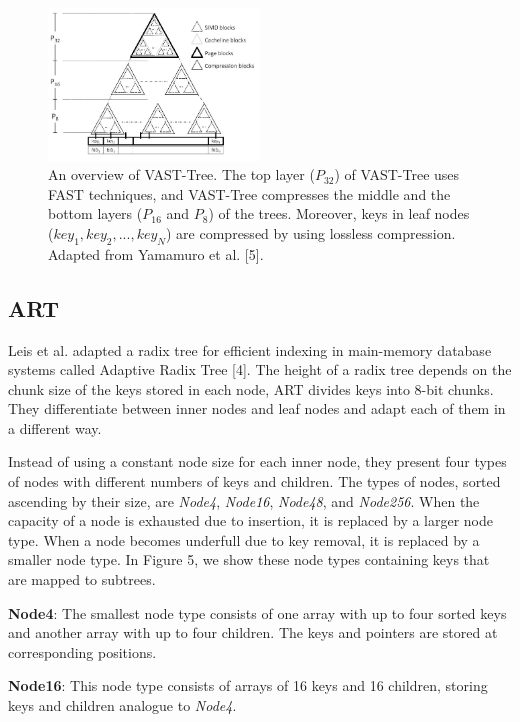 \documentclass[conference]{IEEEtran}
\begin{document}
\begin{figure}
	\includegraphics[width=0.5\textwidth]{figure_5.png}
	\caption{An overview of VAST-Tree. The top layer ($P_{32}$) of VAST-Tree uses FAST techniques, and VAST-Tree compresses the middle and the bottom layers ($P_{16}$ and $P_8$) of the trees. Moreover, keys in leaf nodes ($key_1, key_2, ...,	key_N$) are compressed by using lossless compression. Adapted from Yamamuro et al. [5].}
	\label{fig}
\end{figure}


\subsection{ART}\label{SCM}
Leis et al. adapted a radix tree for efficient indexing in main-memory database systems called Adaptive Radix Tree [4]. The height of a radix tree depends on the chunk size of the keys stored in each node, ART divides keys into 8-bit chunks. They differentiate between inner nodes and leaf nodes and adapt each of them in a different way.

Instead of using a constant node size for each inner node, they present four types of nodes with different numbers of keys and children. The types of nodes, sorted ascending by their size, are \emph{Node4}, \emph{Node16}, \emph{Node48}, and \emph{Node256}. When the capacity of a node is exhausted due to insertion, it is replaced by a larger node type. When a node becomes underfull due to key removal, it is replaced by a smaller node type. In Figure 5, we show these node types containing keys that are mapped to subtrees.

\textbf{Node4}: The smallest node type consists of one array with up to four sorted keys and another array with up to four children. The keys and pointers are stored at corresponding positions.

\textbf{Node16}: This node type consists of arrays of 16 keys and 16 children, storing keys and children analogue to \emph{Node4}.
\end{document}
